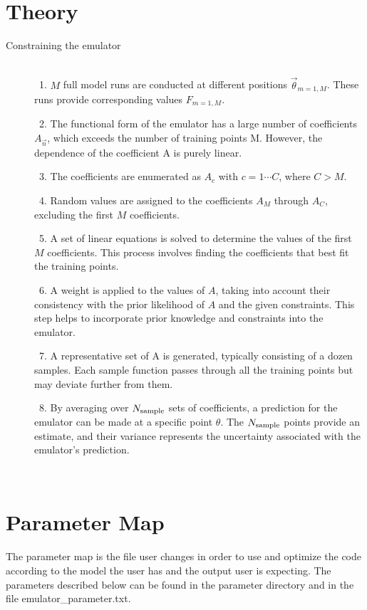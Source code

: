 \documentclass[12pt]{article}
\numberwithin{equation}{section}
\numberwithin{figure}{section}
\begin{document}
\section{Theory}

\begin{description}
\item[Constraining the emulator] \
\\
\ 1. $M$ full model runs are conducted at different positions $\vec{\theta}_{m=1,M}$. These runs provide corresponding values $F_{m=1,M}$. 

\ 2. The functional form of the emulator has a large number of coefficients $A_{\vec{n}}$, which exceeds the number of training points M. However, the dependence of the coefficient A is purely linear. 

\ 3. The coefficients are enumerated as $A_c$ with $c=1\cdots C$, where $C>M$.

\ 4. Random values are assigned to the coefficients $A_M$ through $A_C$, excluding the first $M$ coefficients. 

\ 5. A set of linear equations is solved to determine the values of the first $M$ coefficients. This process involves finding the coefficients that best fit the training points. 

\ 6. A weight is applied to the values of $A$, taking into account their consistency with the prior likelihood of $A$ and the given constraints. This step helps to incorporate prior knowledge and constraints into the emulator. 

\ 7. A representative set of A is generated, typically consisting of a dozen samples. Each sample function passes through all the training points but may deviate further from them. 

\ 8. By averaging over $N_{\rm sample}$ sets of coefficients, a prediction for the emulator can be made at a specific point $\theta$. The $N_{\rm sample}$ points provide an estimate, and their variance represents the uncertainty associated with the emulator's prediction. 

\end{description}\




\appendix


\section{Parameter Map}
The parameter map is the file user changes in order to use and optimize the code according to the model the user has and the output user is expecting. The parameters described below can be found in the parameter directory and in the file emulator\_parameter.txt.
\end{document}
